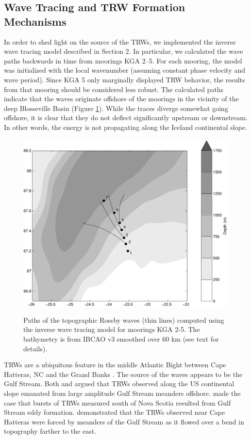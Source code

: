 \documentclass[12pt,titlepage,figuresatend]{article}
\begin{document}
\subsection{Wave Tracing and TRW Formation Mechanisms}

In order to shed light on the source of the TRWs, we implemented the inverse wave tracing model described in Section 2. In particular, we calculated the wave paths backwards in time from moorings KGA 2--5. For each mooring, the model was initialized with the local wavenumber (assuming constant phase velocity and wave period). Since KGA 5 only marginally displayed TRW behavior, the results from that mooring should be considered less robust. The calculated paths indicate that the waves originate offshore of the moorings in the vicinity of the deep Blosseville Basin (Figure \ref{fig_waveTrace}). While the traces diverge somewhat going offshore, it is clear that they do not deflect significantly upstream or downstream. In other words, the energy is not propagating along the Iceland continental slope.

\begin{figure}[p!]
  \centering\includegraphics[width=\hsize]{./figures/wave_trace.pdf}
  \caption{Paths of the topographic Rossby waves (thin lines) computed using the inverse wave tracing model for moorings KGA 2-5. The bathymetry is from IBCAO v3 smoothed over 60 km (see text for details).}{\label{fig_waveTrace}}
\end{figure}

TRWs are a ubiquitous feature in the middle Atlantic Bight between Cape Hatteras, NC and the Grand Banks \cite[]{Louis1982,Johns1986,Pickart1990}. The source of the waves appears to be the Gulf Stream. Both \cite{Hogg1981} and \cite{Schultz1987} argued that TRWs observed along the US continental slope emanated from large amplitude Gulf Stream meanders offshore. \cite{Louis1982} made the case that bursts of TRWs measured south of Nova Scotia resulted from Gulf Stream eddy formation. \cite{Pickart1995} demonstrated that the TRWs observed near Cape Hatteras were forced by meanders of the Gulf Stream as it flowed over a bend in topography farther to the east. 
\end{document}
